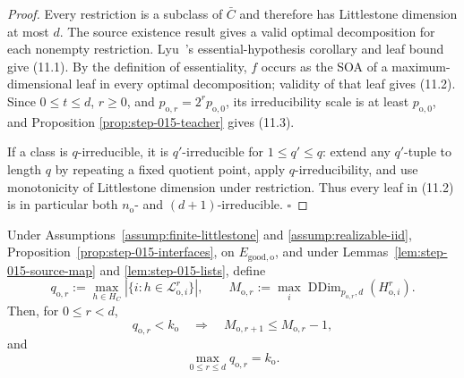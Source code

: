 \begin{proof}
Every restriction is a subclass of \(\bar C\) and therefore has
Littlestone dimension at most \(d\). The source existence result
gives a valid optimal decomposition for each nonempty restriction.
Lyu~\citep{lyu2025}'s essential-hypothesis corollary and leaf bound give (11.1). By the
definition of essentiality, \(f\) occurs as the SOA of a
maximum-dimensional leaf in every optimal decomposition; validity of that
leaf gives (11.2). Since \(0\le t\le d\), \(r\ge0\), and
\(p_{\mathrm o,r}=2^rp_{\mathrm o,0}\), its irreducibility scale is at
least \(p_{\mathrm o,0}\), and Proposition
\ref{prop:step-015-teacher} gives (11.3).

If a class is \(q\)-irreducible, it is \(q'\)-irreducible for
\(1\le q'\le q\): extend any \(q'\)-tuple to length \(q\) by repeating a
fixed quotient point, apply \(q\)-irreducibility, and use monotonicity of
Littlestone dimension under restriction. Thus every leaf in (11.2) is in
particular both \(n_{\mathrm o}\)- and \((d+1)\)-irreducible. \(\square\)


\end{proof}

\begin{proposition}\label{prop:step-015-descent}
Under Assumptions~\ref{assump:finite-littlestone} and
\ref{assump:realizable-iid},
Proposition~\ref{prop:step-015-interfaces}, on \(E_{\mathrm{good,o}}\), and under
Lemmas~\ref{lem:step-015-source-map} and
\ref{lem:step-015-lists}, define
\[
q_{\mathrm o,r}:=
\max_{h\in H_C}|\{i:h\in\mathcal L_{\mathrm o,i}^r\}|,
\qquad
M_{\mathrm o,r}:=
\max_i\operatorname{DDim}_{p_{\mathrm o,r},d}
(H_{\mathrm o,i}^r).
\tag{12.1}
\]
Then, for \(0\le r<d\),
\[
q_{\mathrm o,r}<k_{\mathrm o}
\quad\Longrightarrow\quad
M_{\mathrm o,r+1}\le M_{\mathrm o,r}-1,
\tag{12.2}
\]
and
\[
\max_{0\le r\le d}q_{\mathrm o,r}=k_{\mathrm o}.
\tag{12.3}
\]


\end{proposition}


